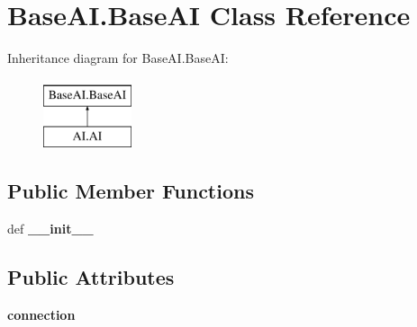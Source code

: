 \hypertarget{classBaseAI_1_1BaseAI}{\section{\-Base\-A\-I.\-Base\-A\-I \-Class \-Reference}
\label{classBaseAI_1_1BaseAI}
}
\-Inheritance diagram for \-Base\-A\-I.\-Base\-A\-I\-:\begin{figure}[H]
\begin{center}
\leavevmode
\includegraphics[height=2.000000cm]{classBaseAI_1_1BaseAI}
\end{center}
\end{figure}
\subsection*{\-Public \-Member \-Functions}
\begin{DoxyCompactItemize}
\item 
\hypertarget{classBaseAI_1_1BaseAI_a540b5cccb5af512159e2d713b2fb7108}{def {\bfseries \-\_\-\-\_\-init\-\_\-\-\_\-}}\label{classBaseAI_1_1BaseAI_a540b5cccb5af512159e2d713b2fb7108}

\end{DoxyCompactItemize}
\subsection*{\-Public \-Attributes}
\begin{DoxyCompactItemize}
\item 
\hypertarget{classBaseAI_1_1BaseAI_a4986a0bdaeb89ac672218d9c4ad5dd26}{{\bfseries connection}}\label{classBaseAI_1_1BaseAI_a4986a0bdaeb89ac672218d9c4ad5dd26}

\end{DoxyCompactItemize}

